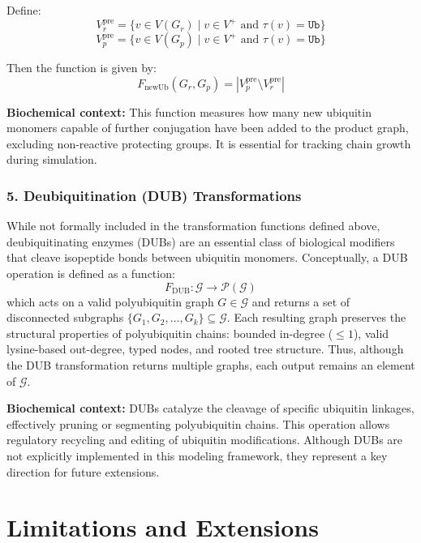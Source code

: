 \documentclass[12pt]{article}
\begin{document}
Define:
\[
V_r^{\text{pre}} = \{v \in V(G_r) \mid v \in V^+ \text{ and } \tau(v) = \texttt{Ub} \}
\]
\[
V_p^{\text{pre}} = \{v \in V(G_p) \mid v \in V^+ \text{ and } \tau(v) = \texttt{Ub} \}
\]

Then the function is given by:
\[
F_{\text{newUb}}(G_r, G_p) = |V_p^{\text{pre}} \setminus V_r^{\text{pre}}|
\]

\textbf{Biochemical context:} This function measures how many new ubiquitin monomers capable of further conjugation have been added to the product graph, excluding non-reactive protecting groups. It is essential for tracking chain growth during simulation.

\subsubsection*{5. Deubiquitination (DUB) Transformations}

While not formally included in the transformation functions defined above, deubiquitinating enzymes (DUBs) are an essential class of biological modifiers that cleave isopeptide bonds between ubiquitin monomers. Conceptually, a DUB operation is defined as a function:
\[
F_{\text{DUB}} : \mathcal{G} \to \mathcal{P}(\mathcal{G})
\]
which acts on a valid polyubiquitin graph \( G \in \mathcal{G} \) and returns a set of disconnected subgraphs \( \{G_1, G_2, \dots, G_k\} \subseteq \mathcal{G} \). Each resulting graph preserves the structural properties of polyubiquitin chains: bounded in-degree ($\leq 1$), valid lysine-based out-degree, typed nodes, and rooted tree structure. Thus, although the DUB transformation returns multiple graphs, each output remains an element of \(\mathcal{G}\).

\vspace{1em}
\textbf{Biochemical context:} DUBs catalyze the cleavage of specific ubiquitin linkages, effectively pruning or segmenting polyubiquitin chains. This operation allows regulatory recycling and editing of ubiquitin modifications. Although DUBs are not explicitly implemented in this modeling framework, they represent a key direction for future extensions.





\section*{Limitations and Extensions}
\end{document}

